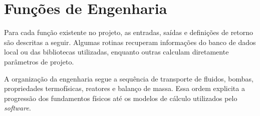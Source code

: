 \section{Funções de Engenharia}

Para cada função existente no projeto, as entradas, saídas e definições de retorno são descritas a seguir. Algumas rotinas recuperam informações do banco de dados local ou das bibliotecas utilizadas, enquanto outras calculam diretamente parâmetros de projeto.

A organização da engenharia segue a sequência de transporte de fluidos, bombas, propriedades termofísicas, reatores e balanço de massa. Essa ordem explicita a progressão dos fundamentos físicos até os modelos de cálculo utilizados pelo \textit{software}.






